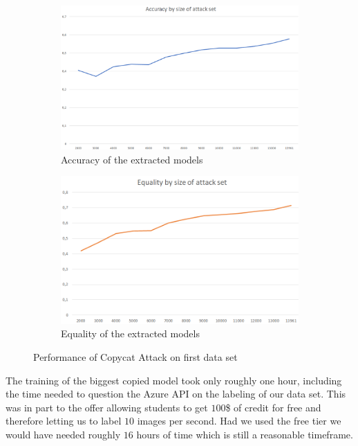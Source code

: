 \documentclass[a4paper,11pt]{article}
\begin{document}
        \begin{figure}[h!]
            \centering
            \begin{subfigure}[c]{0.49\textwidth}
                \centering
                \includegraphics[width=1\textwidth]{exercise_3/paper/images/accuracy_copy_Azure.png}
                \caption{Accuracy of the extracted models}
                \label{fig:Accuracy_Azure}
            \end{subfigure}
            \begin{subfigure}[c]{0.49\textwidth}
                \centering
                \includegraphics[width=1\textwidth]{exercise_3/paper/images/equality_copy_Azure.png}
                \caption{Equality of the extracted models}
                \label{fig:Equality_Azure}
            \end{subfigure}
            \caption{Performance of Copycat Attack on first data set}
            \label{fig:performance-azure}
        \end{figure}
    The training of the biggest copied model took only roughly one hour, including the time needed to question the Azure API on the labeling of our data set. This was in part to the offer allowing students to get $100$\$ of credit for free and therefore letting us to label $10$ images per second. Had we used the free tier we would have needed roughly $16$ hours of time which is still a reasonable timeframe.
\end{document}

